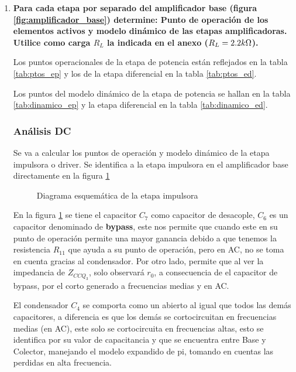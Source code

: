 \begin{enumerate}
  \item \textbf{Para cada etapa por separado del amplificador base (figura \ref{fig:amplificador_base}) determine: Punto de operación de los elementos activos y modelo dinámico de las etapas amplificadoras. Utilice como carga $R_L$ la indicada en el anexo ($R_L=2.2k\ohm$).}

        Los puntos operacionales de la etapa de potencia están reflejados en la tabla \ref{tab:ptos_ep} y los de la etapa diferencial en la tabla \ref{tab:ptos_ed}.

        Los puntos del modelo dinámico de la etapa de potencia se hallan en la tabla \ref{tab:dinamico_ep} y la etapa diferencial en la tabla \ref{tab:dinamico_ed}.

        \subsubsection{Análisis DC}
        Se va a calcular los puntos de operación y modelo dinámico de la etapa impulsora o driver. Se identifica a la etapa impulsora en el amplificador base directamente en la figura \ref{fig:driver}

        \begin{figure}[H]
          \centering
          \caption{Diagrama esquemática de la etapa impulsora}
          \label{fig:driver}
        \end{figure}

        En la figura \ref{fig:driver} se tiene el capacitor $C_7$ como capacitor de desacople, $C_6$ es un capacitor denominado de \textbf{bypass}, este nos permite que cuando este en su punto de operación permite una mayor ganancia debido a que tenemos la resistencia $R_{11}$  que ayuda a su punto de operación, pero en AC, no se toma en cuenta gracias al condensador. Por otro lado, permite que al ver la impedancia de $Z_{CCQ_3}$, solo observará $r_0$, a consecuencia de el capacitor de bypass, por el corto generado a frecuencias medias y en AC.

        El condensador $C_4$ se comporta como un abierto al igual que todos las demás capacitores, a diferencia es que los demás se cortocircuitan en frecuencias medias (en AC), este solo se cortocircuita en frecuencias altas, esto se identifica por su valor de capacitancia y que se encuentra entre Base y Colector, manejando el modelo expandido de pi, tomando en cuentas las perdidas en alta frecuencia.


\end{enumerate}
